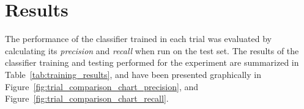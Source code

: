 \documentclass{sig-alternate-05-2015}
\newcommand{\newterm}[1]{{\textit{#1}}}
\begin{document}
	\section{Results} {
	\label{sec:results}

		The performance of the classifier trained in each trial was evaluated by calculating its \newterm{precision} and \newterm{recall} when run on the test set.
		The results of the classifier training and testing performed for the experiment are summarized in Table~\ref{tab:training_results}, and have been presented graphically in Figure~\ref{fig:trial_comparison_chart_precision}, and Figure~\ref{fig:trial_comparison_chart_recall}.


}
\end{document}
